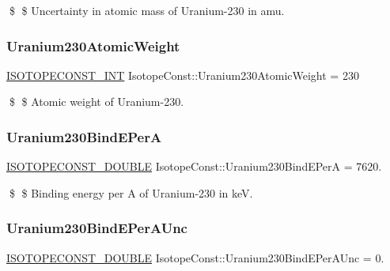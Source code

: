 \$ \$ Uncertainty in atomic mass of Uranium-\/230 in amu. \mbox{\label{group___isotope_const-_uranium-_u230_ga36ad0feef52bc43bdc107ffeaa05346c}} 
\subsubsection{\texorpdfstring{Uranium230\+Atomic\+Weight}{Uranium230AtomicWeight}}
{\footnotesize\ttfamily \mbox{\hyperlink{group___isotope_const-_macros_ga5f18360b3e99483a35c32d789e62621c}{I\+S\+O\+T\+O\+P\+E\+C\+O\+N\+S\+T\+\_\+\+I\+NT}} Isotope\+Const\+::\+Uranium230\+Atomic\+Weight = 230}

\$ \$ Atomic weight of Uranium-\/230. \mbox{\label{group___isotope_const-_uranium-_u230_gaafa72f826ce2adfb4dbad3701ead99e0}} 
\subsubsection{\texorpdfstring{Uranium230\+Bind\+E\+PerA}{Uranium230BindEPerA}}
{\footnotesize\ttfamily \mbox{\hyperlink{group___isotope_const-_macros_ga8f45a7272ce02c0b4c65c44636ed719a}{I\+S\+O\+T\+O\+P\+E\+C\+O\+N\+S\+T\+\_\+\+D\+O\+U\+B\+LE}} Isotope\+Const\+::\+Uranium230\+Bind\+E\+PerA = 7620.}

\$ \$ Binding energy per A of Uranium-\/230 in keV. \mbox{\label{group___isotope_const-_uranium-_u230_gaa2ec47659c789e8e130456e125bc6722}} 
\subsubsection{\texorpdfstring{Uranium230\+Bind\+E\+Per\+A\+Unc}{Uranium230BindEPerAUnc}}
{\footnotesize\ttfamily \mbox{\hyperlink{group___isotope_const-_macros_ga8f45a7272ce02c0b4c65c44636ed719a}{I\+S\+O\+T\+O\+P\+E\+C\+O\+N\+S\+T\+\_\+\+D\+O\+U\+B\+LE}} Isotope\+Const\+::\+Uranium230\+Bind\+E\+Per\+A\+Unc = 0.}

